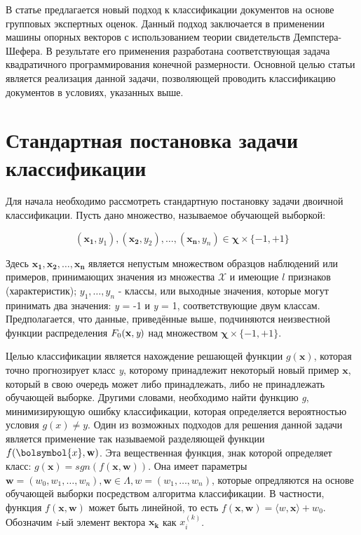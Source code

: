 \documentclass[12pt,a4paper,oneside]{article}
\begin{document}
\par
В статье предлагается новый подход к классификации документов на основе групповых экспертных оценок.
Данный подход заключается в применении машины опорных векторов с использованием теории свидетельств Демпстера-Шефера. 
В результате его применения разработана соответствующая задача квадратичного программирования конечной размерности. 
Основной целью статьи является реализация данной задачи, позволяющей проводить классификацию документов в условиях, указанных выше. 


\section{Стандартная постановка задачи классификации}
\label{sec:standard_classification_problem}

\par
Для начала необходимо рассмотреть стандартную постановку задачи двоичной классификации.
Пусть дано множество, называемое обучающей выборкой:

\[
(\mathbf{x_1}, y_1),(\mathbf{x_2}, y_2), \dots, (\mathbf{x_n}, y_n) \in \mathbf{\chi} \times \{-1,+1\}
\]

\par
Здесь \(\mathbf{x_1}, \mathbf{x_2}, \dots, \mathbf{x_n}\) является непустым множеством образцов наблюдений или примеров, принимающих значения из множества \(\mathcal{X}\) и имеющие $l$ признаков (характеристик); \(y_1, \dots, y_n\) - классы, или выходные значения, которые могут принимать два значения: \emph{y} = -1 и \emph{y} = 1, соответствующие двум классам. 
Предполагается, что данные, приведённые выше, подчиняются неизвестной функции распределения \(F_0(\mathbf{x}, \emph{y})\) над множеством \(\mathbf{\chi} \times \{-1, +1\}\). 

\par
Целью классификации является нахождение решающей функции \(g(\mathbf{x})\), которая точно прогнозирует класс \emph{y}, которому принадлежит некоторый новый пример \(\mathbf{x}\), который в свою очередь может либо принадлежать, либо не принадлежать обучающей выборке. 
Другими словами, необходимо найти функцию \emph{g}, минимизирующую ошибку классификации, которая определяется вероятностью условия \(g(x) \neq y\). 
Один из возможных подходов для решения данной задачи является применение так называемой разделяющей функции \(f(\bolsymbol{x}, \mathbf{w})\). 
Эта вещественная функция, знак которой определяет класс: \(g(\mathbf{x})=sgn(f(\mathbf{x}, \mathbf{w}))\).
Она имеет параметры \(\mathbf{w}=(w_0, w_1, \dots, w_n), \mathbf{w} \in \Lambda, w = (w_1, \dots, w_n)\), которые опредляются на основе обучающей выборки посредством алгоритма классификации. 
В частности, функция \(f(\mathbf{x}, \mathbf{w})\) может быть линейной, то есть \(f(\mathbf{x}, \mathbf{w}) = \langle w, \mathbf{x} \rangle + w_0\). 
Обозначим \emph{i}-ый элемент вектора \(\mathbf{x_k}\) как \(x_i^{(k)}\). 
\end{document}
